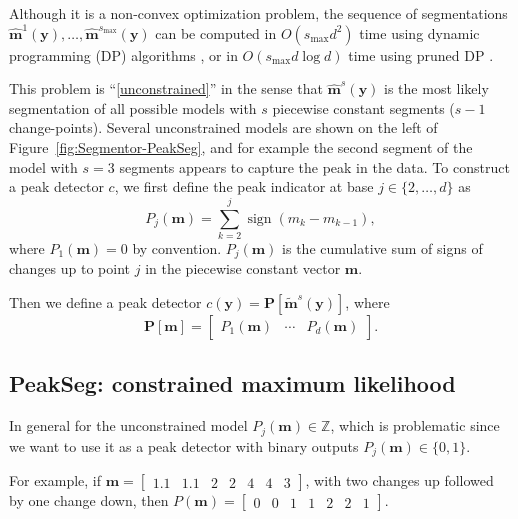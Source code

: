 \documentclass{article}
\DeclareMathOperator*{\sign}{sign}
\newcommand{\ZZ}{\mathbb Z}
\begin{document}
Although it
is a non-convex optimization problem, the sequence of segmentations
$\mathbf{\hat m}^1(\mathbf y), \dots, \mathbf{\hat
  m}^{s_{\text{max}}}(\mathbf y)$ can be computed in $O(s_{\text{max}}
d^2)$ time using dynamic programming (DP) algorithms \citep{bellman},
or in $O(s_{\text{max}} d \log d)$ time using pruned DP
\citep{pruned-dp, Segmentor}.

This problem is ``\ref{unconstrained}'' in the sense that
$\mathbf{\hat m}^s(\mathbf y)$ is the most likely segmentation of all
possible models with $s$ piecewise constant segments ($s-1$
change-points). Several unconstrained models are shown on the left of
Figure~\ref{fig:Segmentor-PeakSeg}, and for example the second segment of the
model with $s=3$ segments appears to capture the peak in the data.
To construct a peak detector $c$, we first define the peak indicator at base
$j\in\{2, \dots, d\}$ as
\begin{equation}
  \label{eq:peaks}
  P_j(\mathbf m) = \sum_{k=2}^j \sign( m_{k} - m_{k-1} ),
\end{equation}
where $P_1(\mathbf m)=0$ by convention. $P_j(\mathbf m)$ is the
cumulative sum of signs of changes up to point $j$ in the piecewise constant
vector $\mathbf m$. 

Then we define a peak detector $c(\mathbf y) = \mathbf P\left[
  \mathbf{\tilde m}^s(\mathbf y) \right]$, where
\begin{equation}
  \mathbf
P[\mathbf m] = \left[\begin{array}{ccc} P_1(\mathbf m) & \cdots &
    P_d(\mathbf m)
\end{array}\right].
\end{equation}

\subsection{PeakSeg: constrained maximum likelihood}
\label{sec:constrained}

In general for the unconstrained model $P_j(\mathbf m)\in\ZZ$, which
is problematic since we want to use it as a peak detector with binary
outputs $P_j(\mathbf m)\in \{0, 1\}$. 

For example, if $\mathbf m = \left[\begin{array}{ccccccc}1.1 &
    1.1 & 2 & 2 & 4 & 4 & 3\end{array}\right]$, with two changes up
followed by one change down, then $P(\mathbf m) =
\left[\begin{array}{ccccccc}0 & 0 & 1 & 1 & 2 & 2 &
    1 \end{array}\right]$.
\end{document}
